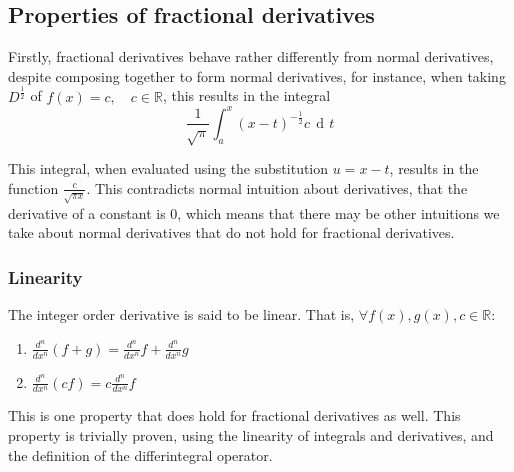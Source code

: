 \documentclass{article}
\DeclareMathOperator{\di}{\,d\!}
\begin{document}
\subsection{Properties of fractional derivatives}

Firstly, fractional derivatives behave rather differently from normal
derivatives, despite composing together to form normal derivatives, for
instance, when taking $D^\frac{1}{2}$ of $f(x)=c, \quad c \in \mathbb{R}$, this
results in the integral
$$
\frac{1}{\sqrt{\pi}} \int_a^x \left(x-t\right)^{-\frac{1}{2}} c \di t
$$

This integral, when evaluated using the substitution $u=x-t$, results in the
function $\frac{c}{\sqrt{\pi x}}$. This contradicts normal intuition about
derivatives, that the derivative of a constant is $0$, which means that there
may be other intuitions we take about normal derivatives that do not hold for
fractional derivatives.

\subsubsection{Linearity}

The integer order derivative is said to be linear. That is, $\forall f(x),g(x),c \in \mathbb{R}$:
\begin{enumerate}
	\item{$\frac{d^n}{dx^n} \left(f + g\right) = \frac{d^n}{dx^n} f + \frac{d^n}{dx^n} g$}
	\item{$\frac{d^n}{dx^n} \left(cf\right) = c\frac{d^n}{dx^n} f$}
\end{enumerate}

This is one property that does hold for fractional derivatives as well. This
property is trivially proven, using the linearity of integrals and derivatives,
and the definition of the differintegral operator.
\end{document}
